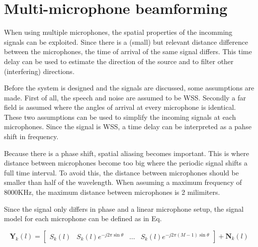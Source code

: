 \section{Multi-microphone beamforming} \label{sec:mm_bf}
When using multiple microphones, the spatial properties of the incomming signals can be exploited. Since there is a (small) but relevant distance difference between the microphones, the time of arrival of the same signal differs. This time delay can be used to estimate the direction of the source and to filter other (interfering) directions.

Before the system is designed and the signals are discussed, some assumptions are made. First of all, the speech and noise are assumed to be WSS. Secondly a far field is assumed where the angles of arrival at every microphone is identical. These two assumptions can be used to simplify the incoming signals at each microphones. Since the signal is WSS, a time delay can be interpreted as a pahse shift in frequency.

Because there is a phase shift, spatial aliasing becomes important. This is where distance between microphones become too big where the periodic signal shifts a full time interval. To avoid this, the distance between microphones should be smaller than half of the wavelength. When assuming a maximum frequency of 8000KHz, the maximum distance between microphones is 2 milimiters.

Since the signal only differs in phase and a linear microphone setup, the signal model for each microphone can be defined as in Eq.

\begin{equation}
  \mathbf{Y}_{k}(l) =
  \begin{bmatrix}
    S_{k}(l) & S_{k}(l)e^{-j2\pi \sin{\theta}} &\hdots & S_{k}(l)e^{-j2\pi(M-1)\sin{\theta}}
  \end{bmatrix}
  + \mathbf{N}_{k}(l)
\end{equation}
